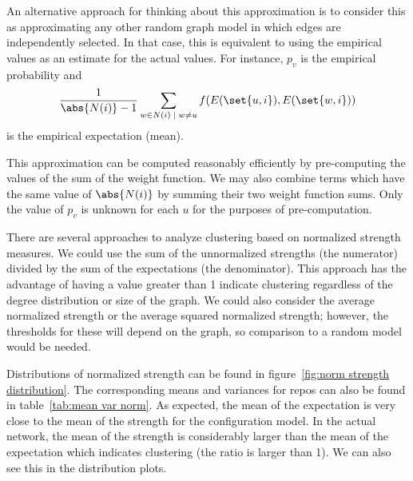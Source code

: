 \documentclass{pset}
\begin{document}
An alternative approach for thinking about this approximation is to consider
this as approximating any other random graph model in which edges are
independently selected.  In that case, this is equivalent to using the
empirical values as an estimate for the actual values.  For instance, $p_v$ is
the empirical probability and
\[\frac{1}{\abs{N(i)} - 1} \sum_{w \in N(i) \;|\; w \neq u} 
f(E(\set{u, i}), E(\set{w, i}))\]
is the empirical expectation (mean).

This approximation can be computed reasonably efficiently by pre-computing
the values of the sum of the weight function. We may also combine terms which
have the same value of $\abs{N(i)}$ by summing their two weight function sums.
Only the value of $p_v$ is unknown for each $u$ for the purposes of pre-computation.


There are several approaches to analyze clustering based on normalized strength
measures. We could use the sum of the unnormalized strengths (the
numerator) divided by the sum of the expectations (the denominator). This
approach has the advantage of having a value greater than 1 indicate clustering
regardless of the degree distribution or size of the graph.
We could also consider the average normalized strength or the average squared
normalized strength; however, the thresholds for these will depend on the graph,
so comparison to a random model would be needed.

Distributions of normalized strength can be found in
figure~\ref{fig:norm strength distribution}. 
The corresponding means and variances for repos can also be found in
table~\ref{tab:mean var norm}. As expected, the mean of the expectation is very
close to the mean of the strength for the configuration model.
In the actual network, the mean of the strength is considerably larger than the mean of
the expectation which indicates clustering (the ratio is larger than 1).
We can also see this in the distribution plots.
\end{document}
